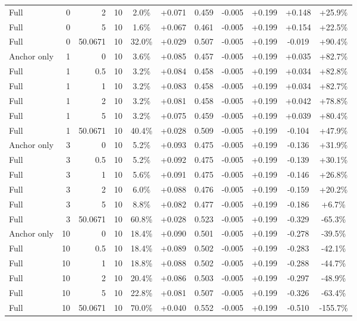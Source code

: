 \begin{table}[htbp]
\begin{tabular}{lrrrccccccc}
Full & 0 & 2 & 10 & 2.0\% & +0.071 & 0.459 & -0.005 & +0.199 & +0.148 & +25.9\% \\
Full & 0 & 5 & 10 & 1.6\% & +0.067 & 0.461 & -0.005 & +0.199 & +0.154 & +22.5\% \\
Full & 0 & 50.0671 & 10 & 32.0\% & +0.029 & 0.507 & -0.005 & +0.199 & -0.019 & +90.4\% \\
Anchor only & 1 & 0 & 10 & 3.6\% & +0.085 & 0.457 & -0.005 & +0.199 & +0.035 & +82.7\% \\
Full & 1 & 0.5 & 10 & 3.2\% & +0.084 & 0.458 & -0.005 & +0.199 & +0.034 & +82.8\% \\
Full & 1 & 1 & 10 & 3.2\% & +0.083 & 0.458 & -0.005 & +0.199 & +0.034 & +82.7\% \\
Full & 1 & 2 & 10 & 3.2\% & +0.081 & 0.458 & -0.005 & +0.199 & +0.042 & +78.8\% \\
Full & 1 & 5 & 10 & 3.2\% & +0.075 & 0.459 & -0.005 & +0.199 & +0.039 & +80.4\% \\
Full & 1 & 50.0671 & 10 & 40.4\% & +0.028 & 0.509 & -0.005 & +0.199 & -0.104 & +47.9\% \\
Anchor only & 3 & 0 & 10 & 5.2\% & +0.093 & 0.475 & -0.005 & +0.199 & -0.136 & +31.9\% \\
Full & 3 & 0.5 & 10 & 5.2\% & +0.092 & 0.475 & -0.005 & +0.199 & -0.139 & +30.1\% \\
Full & 3 & 1 & 10 & 5.6\% & +0.091 & 0.475 & -0.005 & +0.199 & -0.146 & +26.8\% \\
Full & 3 & 2 & 10 & 6.0\% & +0.088 & 0.476 & -0.005 & +0.199 & -0.159 & +20.2\% \\
Full & 3 & 5 & 10 & 8.8\% & +0.082 & 0.477 & -0.005 & +0.199 & -0.186 & +6.7\% \\
Full & 3 & 50.0671 & 10 & 60.8\% & +0.028 & 0.523 & -0.005 & +0.199 & -0.329 & -65.3\% \\
Anchor only & 10 & 0 & 10 & 18.4\% & +0.090 & 0.501 & -0.005 & +0.199 & -0.278 & -39.5\% \\
Full & 10 & 0.5 & 10 & 18.4\% & +0.089 & 0.502 & -0.005 & +0.199 & -0.283 & -42.1\% \\
Full & 10 & 1 & 10 & 18.8\% & +0.088 & 0.502 & -0.005 & +0.199 & -0.288 & -44.7\% \\
Full & 10 & 2 & 10 & 20.4\% & +0.086 & 0.503 & -0.005 & +0.199 & -0.297 & -48.9\% \\
Full & 10 & 5 & 10 & 22.8\% & +0.081 & 0.507 & -0.005 & +0.199 & -0.326 & -63.4\% \\
Full & 10 & 50.0671 & 10 & 70.0\% & +0.040 & 0.552 & -0.005 & +0.199 & -0.510 & -155.7\% \\

\end{tabular}
\end{table}
